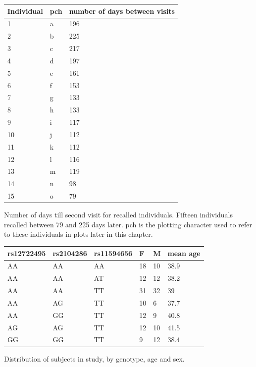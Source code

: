 \begin{table}[h]
\centering
\begin{tabular}{lll}
  \hline
  Individual      &  pch           & number of days between visits \\
  \hline
  1      &  a       & 196 \\
  2      &  b       & 225 \\
  3      &  c       & 217 \\
  4      &  d       & 197 \\
  5      &  e       & 161 \\
  6      &  f       & 153 \\
  7      &  g       & 133 \\
  8      &  h       & 133 \\
  9      &  i       & 117 \\
  10     &  j       & 112 \\
  11     &  k       & 112 \\
  12     &  l       & 116 \\
  13     &  m       & 119 \\
  14     &  n       & 98 \\
  15     &  o       & 79  \\
  \hline
\end{tabular}
{Number of days till second visit for recalled individuals.}
{
Fifteen individuals recalled between 79 and 225 days later.
pch is the plotting character used to refer to these individuals in plots later in this chapter.
}
\end{table}

\begin{table}[h]
\centering
\begin{tabular}{llllll}
\hline
rs12722495 & rs2104286 & rs11594656 & F & M & mean age\\
\hline
AA & AA & AA & 18 & 10 & 38.9\\
AA & AA & AT & 12 & 12 & 38.2\\
AA & AA & TT & 31 & 32 & 39\\
AA & AG & TT & 10 & 6 & 37.7\\
AA & GG & TT & 12 & 9 & 40.8\\
AG & AG & TT & 12 & 10 & 41.5\\
GG & GG & TT & 9 & 12 & 38.4\\
\end{tabular}
{ Distribution of subjects in study, by genotype, age and sex.}
{
}
\end{table}


